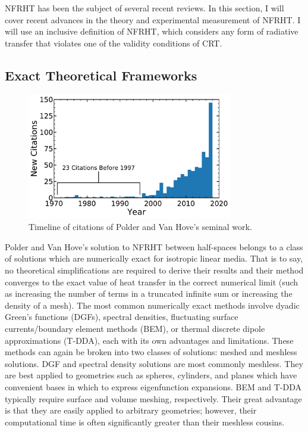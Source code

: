 NFRHT has been the subject of several recent reviews.\cite{Joulain2005, Volokitin2007, Basu2009, Shen2013, Song2015, Edalatpour2016a, Greffet2017, Boriskina2017, Cuevas2018} In this section, I will cover recent advances in the theory and experimental measurement of NFRHT. I will use an inclusive definition of NFRHT, which considers any form of radiative transfer that violates one of the validity conditions of CRT.


\subsection{Exact Theoretical Frameworks}
%
\begin{figure}
\centering
\includegraphics[width=0.8\textwidth]{./Figures/Polder1971Citations.pdf}
\caption{Timeline of citations of Polder and Van Hove's seminal work.\cite{Polder1971}}
\label{fig:Polder1971Citations}
\end{figure}
%
Polder and Van Hove's solution to NFRHT between half-spaces belongs to a class of solutions which are numerically exact for isotropic linear media. That is to say, no theoretical simplifications are required to derive their results and their method converges to the exact value of heat transfer in the correct numerical limit (such as increasing the number of terms in a truncated infinite sum or increasing the density of a mesh). The most common numerically exact methods involve dyadic Green's functions (DGFs),\cite{Joulain2005, Volokitin2007, Francoeur2008, Narayanaswamy2013a} spectral densities,\cite{Kruger2012} fluctuating surface currents/boundary element methods (BEM),\cite{Rodriguez2012} or thermal discrete dipole approximations (T-DDA),\cite{Edalatpour2014} each with its own advantages and limitations. These methods can again be broken into two classes of solutions: meshed and meshless solutions. DGF and spectral density solutions are most commonly meshless. They are best applied to geometries such as spheres, cylinders, and planes which have convenient bases in which to express eigenfunction expansions. BEM and T-DDA typically require surface and volume meshing, respectively. Their great advantage is that they are easily applied to arbitrary geometries; however, their computational time is often significantly greater than their meshless cousins. 

